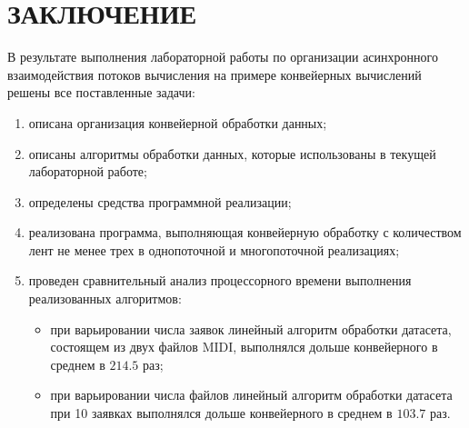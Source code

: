 \chapter*{ЗАКЛЮЧЕНИЕ}

В результате выполнения лабораторной работы по организации асинхронного взаимодействия потоков вычисления на примере конвейерных вычислений решены все поставленные задачи:
\begin{enumerate}
    \item описана организация конвейерной обработки данных;
	\item описаны алгоритмы обработки данных, которые использованы в текущей лабораторной работе;
	\item определены средства программной реализации;
    \item реализована программа, выполняющая конвейерную обработку с количеством лент не менее трех в однопоточной и многопоточной реализациях;
	\item проведен сравнительный анализ процессорного времени выполнения реализованных алгоритмов:
	\begin{itemize}
	\item при варьировании числа заявок линейный алгоритм обработки датасета, состоящем из двух файлов MIDI, выполнялся дольше конвейерного в среднем в $214.5$ раз;
	\item при варьировании числа файлов линейный алгоритм обработки датасета при 10 заявках выполнялся дольше конвейерного в среднем в $103.7$ раз.
	\end{itemize}
\end{enumerate}